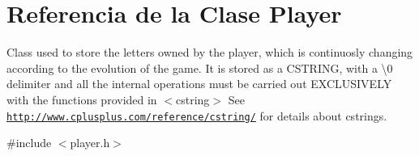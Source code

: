\hypertarget{classPlayer}{}\section{Referencia de la Clase Player}
\label{classPlayer}


Class used to store the letters owned by the player, which is continuosly changing according to the evolution of the game. It is stored as a C\+S\+T\+R\+I\+NG, with a \textbackslash{}0 delimiter and all the internal operations must be carried out E\+X\+C\+L\+U\+S\+I\+V\+E\+LY with the functions provided in $<$cstring$>$ See \href{http://www.cplusplus.com/reference/cstring/}{\tt http\+://www.\+cplusplus.\+com/reference/cstring/} for details about cstrings.  




{\ttfamily \#include $<$player.\+h$>$}

